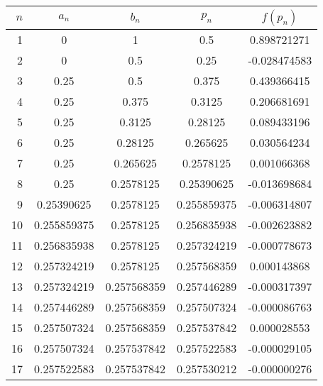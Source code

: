 \documentclass[../../Assignments.tex]{subfiles}
\begin{document}
\begin{solution}
\begin{enumerate}[label=(\alph*)]
            \begin{longtable}{r S[table-format=1.9] S[table-format=1.9] S[table-format=1.9] S[table-format=-1.9]}
                \toprule
                \(n\)  &   {\(a_n\)}   &   {\(b_n\)}   &   {\(p_n\)}   &  {\(f(p_n)\)}  \\
                  &  0            &  1            &  0.5          &   0.898721271  \\
                    2  &  0            &  0.5          &  0.25         &  -0.028474583  \\
                    3  &  0.25         &  0.5          &  0.375        &   0.439366415  \\
                    4  &  0.25         &  0.375        &  0.3125       &   0.206681691  \\
                    5  &  0.25         &  0.3125       &  0.28125      &   0.089433196  \\
                    6  &  0.25         &  0.28125      &  0.265625     &   0.030564234  \\
                    7  &  0.25         &  0.265625     &  0.2578125    &   0.001066368  \\
                    8  &  0.25         &  0.2578125    &  0.25390625   &  -0.013698684  \\
                    9  &  0.25390625   &  0.2578125    &  0.255859375  &  -0.006314807  \\
                   10  &  0.255859375  &  0.2578125    &  0.256835938  &  -0.002623882  \\
                   11  &  0.256835938  &  0.2578125    &  0.257324219  &  -0.000778673  \\
                   12  &  0.257324219  &  0.2578125    &  0.257568359  &   0.000143868  \\
                   13  &  0.257324219  &  0.257568359  &  0.257446289  &  -0.000317397  \\
                   14  &  0.257446289  &  0.257568359  &  0.257507324  &  -0.000086763  \\
                   15  &  0.257507324  &  0.257568359  &  0.257537842  &   0.000028553  \\
                   16  &  0.257507324  &  0.257537842  &  0.257522583  &  -0.000029105  \\
                   17  &  0.257522583  &  0.257537842  &  0.257530212  &  -0.000000276  \\
                \bottomrule
            \end{longtable}


\end{enumerate}
\end{solution}
\end{document}
